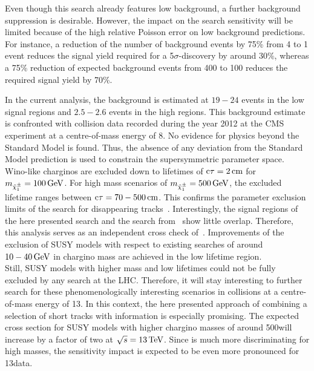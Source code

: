 Even though this search already features low background, a further background suppression is desirable.
However, the impact on the search sensitivity will be limited because of the high relative Poisson error on low background predictions.
For instance, a reduction of the number of background events by 75\% from 4 to 1 event reduces the signal yield required for a 5$\sigma$-discovery by around 30\%, whereas a 75\% reduction of expected background events from 400 to 100 reduces the required signal yield by 70\%.

In the current analysis, the background is estimated at $19-24$ events in the low \ias signal regions and $2.5-2.6$ events in the high \ias regions.
This background estimate is confronted with collision data recorded during the year 2012 at the CMS experiment at a centre-of-mass energy of 8\tev.
No evidence for physics beyond the Standard Model is found. %
Thus, the absence of any deviation from the Standard Model prediction is used to constrain the supersymmetric parameter space.
Wino-like charginos are excluded down to lifetimes of $\text{c}\tau=2\,\text{cm}$ for $m_{\tilde{\chi}^{\pm}_{1}}=100\,\text{Ge}\kern-0.06667em\text{V}$.
For high mass scenarios of $m_{\tilde{\chi}^{\pm}_{1}}=500\,\text{Ge}\kern-0.06667em\text{V}$, the excluded lifetime ranges between $\text{c}\tau=70-500\,\text{cm}$.
This confirms the parameter exclusion limits of the search for disappearing tracks~\cite{bib:CMS:DT_8TeV}.
Interestingly, the signal regions of the here presented search and the search from~\cite{bib:CMS:DT_8TeV} show little overlap.
Therefore, this analysis serves as an independent cross check of~\cite{bib:CMS:DT_8TeV}.
Improvements of the exclusion of SUSY models with respect to existing searches of around $10-40\,\text{Ge}\kern-0.06667em\text{V}$ in chargino mass are achieved in the low lifetime region.\\

Still, SUSY models with higher mass and low lifetimes could not be fully excluded by any search at the LHC.
Therefore, it will stay interesting to further search for these phenomenologically interesting scenarios in collisions at a centre-of-mass energy of 13\tev.
In this context, the here presented approach of combining a selection of short tracks with \dedx information is especially promising.
The expected cross section for SUSY models with higher chargino masses of around 500\gev will increase by a factor of two at $\sqrt{s}= 13\,\text{Te}\kern-0.06667em\text{V}$.
Since \dedx is much more discriminating for high masses, the sensitivity impact is expected to be even more pronounced for 13\tev data.


